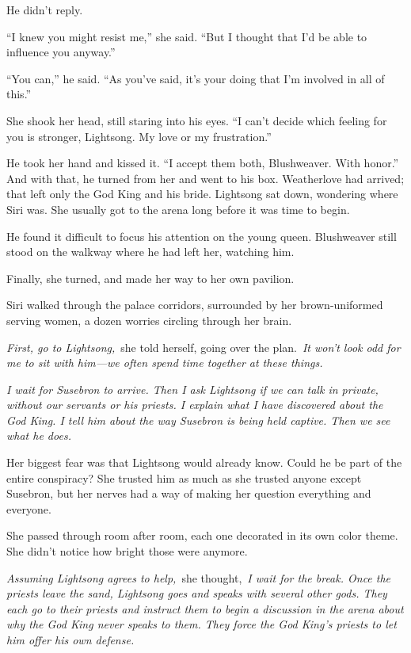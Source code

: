 He didn’t reply.

“I knew you might resist me,” she said. “But I thought that I’d be able to influence you anyway.”

“You can,” he said. “As you’ve said, it’s your doing that I’m involved in all of this.”

She shook her head, still staring into his eyes. “I can’t decide which feeling for you is stronger, Lightsong. My love or my frustration.”

He took her hand and kissed it. “I accept them both, Blushweaver. With honor.” And with that, he turned from her and went to his box. Weatherlove had arrived; that left only the God King and his bride. Lightsong sat down, wondering where Siri was. She usually got to the arena long before it was time to begin.

He found it difficult to focus his attention on the young queen. Blushweaver still stood on the walkway where he had left her, watching him.

Finally, she turned, and made her way to her own pavilion.

\orn

Siri walked through the palace corridors, surrounded by her brown-uniformed serving women, a dozen worries circling through her brain.

\textit{First, go to Lightsong,}~she told herself, going over the plan.~\textit{It won’t look odd for me to sit with him—we often spend time together at these things.}

\textit{I wait for Susebron to arrive. Then I ask Lightsong if we can talk in private, without our servants or his priests. I explain what I have discovered about the God King. I tell him about the way Susebron is being held captive. Then we see what he does.}

Her biggest fear was that Lightsong would already know. Could he be part of the entire conspiracy? She trusted him as much as she trusted anyone except Susebron, but her nerves had a way of making her question everything and everyone.

She passed through room after room, each one decorated in its own color theme. She didn’t notice how bright those were anymore.

\textit{Assuming Lightsong agrees to help,}~she thought,~\textit{I wait for the break. Once the priests leave the sand, Lightsong goes and speaks with several other gods. They each go to their priests and instruct them to begin a discussion in the arena about why the God King never speaks to them. They force the God King’s priests to let him offer his own defense.}

